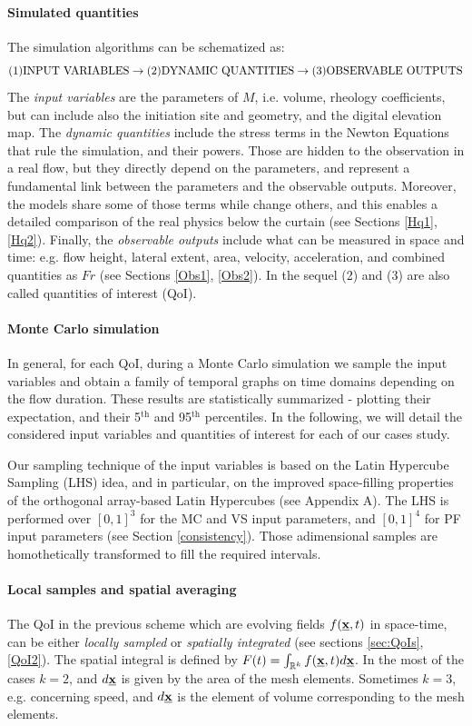 \documentclass{article}
\begin{document}
\paragraph{Simulated quantities} The simulation algorithms can be schematized as:
$$\textmd{(1)INPUT VARIABLES} \rightarrow \textmd{(2)DYNAMIC QUANTITIES} \rightarrow \textmd{(3)OBSERVABLE OUTPUTS}$$
The \emph{input variables} are the parameters of $M$, i.e. volume, rheology coefficients, but can include also the initiation site and geometry, and the digital elevation map. The \emph{dynamic quantities} include the stress terms in the Newton Equations that rule the simulation, and their powers. Those are hidden to the observation in a real flow, but they directly depend on the parameters, and represent a fundamental link between the parameters and the observable outputs. Moreover, the models share some of those terms while change others, and this enables a detailed comparison of the real physics below the curtain (see Sections \ref{Hq1},\ref{Hq2}). Finally, the \emph{observable outputs} include what can be measured in space and time: e.g. flow height, lateral extent, area, velocity, acceleration, and combined quantities as $Fr$ (see Sections \ref{Obs1}, \ref{Obs2}). In the sequel (2) and (3) are also called quantities of interest (QoI).

\paragraph{Monte Carlo simulation} In general, for each QoI, during a Monte Carlo simulation we sample the input variables and obtain a family of temporal graphs on time domains depending on the flow duration. These results are statistically summarized - plotting their expectation, and their 5$^{\mathrm{th}}$ and 95$^{\mathrm{th}}$ percentiles. In the following, we will detail the considered input variables and quantities of interest for each of our cases study.

Our sampling technique of the input variables is based on the Latin Hypercube Sampling (LHS) idea, and in particular, on the improved space-filling properties of the orthogonal array-based Latin Hypercubes (see Appendix A). The LHS is performed over $[0,1]^3$ for the MC and VS input parameters, and $[0,1]^4$ for PF input parameters (see Section \ref{consistency}). Those adimensional samples are homothetically transformed to fill the required intervals.

\paragraph{Local samples and spatial averaging}
The QoI in the previous scheme which are evolving fields $f(\underline{\textbf x},t)$ in space-time, can be either \emph{locally sampled} or \emph{spatially integrated} (see sections \ref{sec:QoIs}, \ref{QoI2}). The spatial integral is defined by $F(t)=\int_{\mathbb R^k}f(\underline{\textbf x},t) d\underline{\textbf x}$. In the most of the cases $k=2$, and $d\underline{\textbf x}$ is given by the area of the mesh elements. Sometimes $k=3$, e.g. concerning speed, and $d\underline{\textbf x}$ is the element of volume corresponding to the mesh elements.
\end{document}

